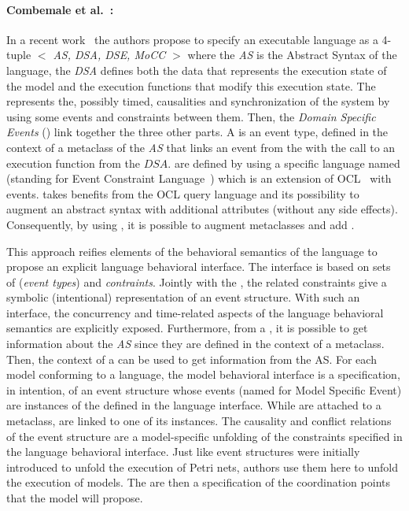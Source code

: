 {\paragraph{Combemale et al.~\cite{sle13-combemale}:}
In a recent work~\cite{sle13-combemale} the authors propose to specify an executable language as a 4-tuple \emph{$<$ AS, DSA, DSE, MoCC $>$} where the \emph{AS} is the Abstract Syntax of the language, the \emph{DSA} defines both the data that represents the execution state of the model and the execution functions that modify this execution state. The \mocc represents the, possibly timed, causalities and synchronization of the system by using some events and constraints between them. Then, the \emph{Domain Specific Events} (\dse) link together the three other parts. A \dse is an event type, defined in the context of a metaclass of the \emph{AS} that links an event from the \mocc with the call to an execution function from the $DSA$. \dse are defined by using a specific language named \ecl (standing for Event Constraint Language~\cite{eclbib}) which is an extension of OCL~\cite{omgocl2bib} with events. \ecl takes benefits from the OCL query language and its possibility to augment an abstract syntax with additional attributes (without any side effects). Consequently, by using \ecl, it is possible to augment \as metaclasses and add \dse. 

This approach reifies elements of the behavioral semantics of the language to propose an explicit language behavioral interface. The interface is based on sets of \dse (\emph{event types}) and \emph{contraints}. Jointly with the \dse, the related constraints give a symbolic (intentional) representation of an event structure. With such an interface, the concurrency and time-related aspects of the language behavioral semantics are explicitly exposed.
%
Furthermore, from a \dse, it is possible to get information about the \emph{AS} since they are defined in the context of a metaclass. Then, the context of a \dse can be used to get information from the AS.   
For each model conforming to a language, the model behavioral interface is a specification, in intention, of an event structure whose events (named \mse for Model Specific Event) are instances of the \dse defined in the language interface. While \dse are attached to a metaclass, \mse are linked to one of its instances. The causality and conflict relations of the event structure are a model-specific unfolding of the constraints specified in the language behavioral interface. Just like event structures were initially introduced to unfold the execution of Petri nets, authors use them here to unfold the execution of models. The \dse are then a specification of the coordination points that the model will propose.

}
